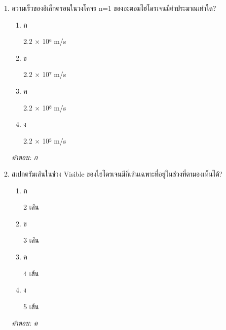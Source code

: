 \documentclass[12pt]{article}
\begin{document}
\begin{enumerate}[label=\arabic*., itemsep=0.5\baselineskip, topsep=0.5\baselineskip, leftmargin=*]
\item ความเร็วของอิเล็กตรอนในวงโคจร n=1 ของอะตอมไฮโดรเจนมีค่าประมาณเท่าใด?
\begin{enumerate}[label=\alph*)., itemsep=0.3\baselineskip, topsep=0.3\baselineskip]
\item ก\ 
\begin{minipage}[t]{0.9\linewidth}
\raggedright 2.2 × 10⁶ m/s
\end{minipage}
\item ข\ 
\begin{minipage}[t]{0.9\linewidth}
\raggedright 2.2 × 10⁷ m/s
\end{minipage}
\item ค\ 
\begin{minipage}[t]{0.9\linewidth}
\raggedright 2.2 × 10⁸ m/s
\end{minipage}
\item ง\ 
\begin{minipage}[t]{0.9\linewidth}
\raggedright 2.2 × 10⁵ m/s
\end{minipage}
\end{enumerate}
\vspace{-0.3\baselineskip}
\begin{small}
\textit{คำตอบ: ก}
\end{small}

\item สเปกตรัมเส้นในช่วง Visible ของไฮโดรเจนมีกี่เส้นเฉพาะที่อยู่ในช่วงที่ตามองเห็นได้?
\begin{enumerate}[label=\alph*)., itemsep=0.3\baselineskip, topsep=0.3\baselineskip]
\item ก\ 
\begin{minipage}[t]{0.9\linewidth}
\raggedright 2 เส้น
\end{minipage}
\item ข\ 
\begin{minipage}[t]{0.9\linewidth}
\raggedright 3 เส้น
\end{minipage}
\item ค\ 
\begin{minipage}[t]{0.9\linewidth}
\raggedright 4 เส้น
\end{minipage}
\item ง\ 
\begin{minipage}[t]{0.9\linewidth}
\raggedright 5 เส้น
\end{minipage}
\end{enumerate}
\vspace{-0.3\baselineskip}
\begin{small}
\textit{คำตอบ: ค}
\end{small}


\end{enumerate}
\end{document}
